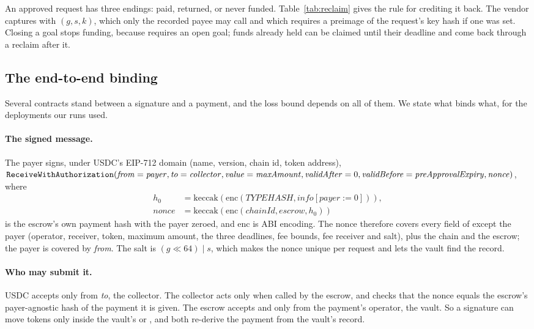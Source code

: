 An approved request has three endings: paid, returned, or never funded. Table~\ref{tab:reclaim} gives the rule for crediting it back.
The vendor captures with $(g, s, k)$, which only the recorded payee may call and which requires a preimage of the request's
key hash if one was set. Closing a goal stops funding, because  requires an open goal; funds already held can be claimed
until their deadline and come back through a reclaim after it.

\subsection{The end-to-end binding}
\label{sec:binding}

Several contracts stand between a signature and a payment, and the loss bound depends on all of them. We state what binds what, for the
deployments our runs used.

\paragraph{The signed message.} The payer signs, under USDC's EIP-712 domain (name, version, chain id, token address),
$\texttt{ReceiveWithAuthorization}(\mathit{from} = \mathit{payer}, \mathit{to} = \mathit{collector}, \mathit{value} = \mathit{maxAmount},
\mathit{validAfter} = 0, \mathit{validBefore} = \mathit{preApprovalExpiry}, \mathit{nonce})$, where
\begin{align*}
h_0 &= \mathrm{keccak}(\mathrm{enc}(\mathit{TYPEHASH}, \mathit{info}[\mathit{payer} := 0])),\\
\mathit{nonce} &= \mathrm{keccak}(\mathrm{enc}(\mathit{chainId}, \mathit{escrow}, h_0))
\end{align*}
is the escrow's own payment hash with the payer zeroed, and $\mathrm{enc}$ is ABI encoding. The nonce therefore covers every field of
 except the payer (operator, receiver, token, maximum amount, the three deadlines, fee bounds, fee receiver and salt),
plus the chain and the escrow; the payer is covered by \textit{from}. The salt is $(g \ll 64) \mathbin{|} s$, which makes the nonce
unique per request and lets the vault find the record.

\paragraph{Who may submit it.} USDC accepts  only from \textit{to}, the collector. The collector acts only
when called by the escrow, and checks that the nonce equals the escrow's payer-agnostic hash of the payment it is given. The escrow accepts
 and  only from the payment's operator, the vault. So a signature can move tokens only inside the vault's
 or , and both re-derive the payment from the vault's record.

